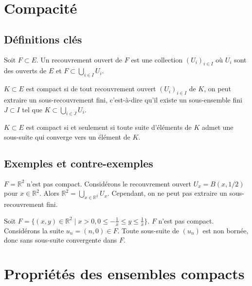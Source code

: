 \documentclass[oneside]{book}
\begin{document}
\section{Compacité}

\subsection{Définitions clés}

\begin{definition}
Soit $F \subset E$. Un recouvrement ouvert de $F$ est une collection $(U_i)_{i \in I}$ où $U_i$ sont des ouverts de $E$ et $F \subset \bigcup_{i \in I} U_i$.
\end{definition}

\begin{definition}
$K \subset E$ est compact si de tout recouvrement ouvert $(U_i)_{i \in I}$ de $K$, on peut extraire un sous-recouvrement fini, c'est-à-dire qu'il existe un sous-ensemble fini $J \subset I$ tel que $K \subset \bigcup_{i \in J} U_i$.
\end{definition}

\begin{theorem}
$K \subset E$ est compact si et seulement si toute suite d'éléments de $K$ admet une sous-suite qui converge vers un élément de $K$.
\end{theorem}

\subsection{Exemples et contre-exemples}

\begin{example}
$F = \mathbb{R}^2$ n'est pas compact. Considérons le recouvrement ouvert $U_x = B(x, 1/2)$ pour $x \in \mathbb{R}^2$. Alors $\mathbb{R}^2 = \bigcup_{x \in \mathbb{R}^2} U_x$. Cependant, on ne peut pas extraire un sous-recouvrement fini.
\end{example}

\begin{example}
Soit $F = \{(x, y) \in \mathbb{R}^2 \mid x > 0, 0 \leq -\frac{1}{x} \leq y \leq \frac{1}{x} \}$. $F$ n'est pas compact. Considérons la suite $u_n = (n, 0) \in F$. Toute sous-suite de $(u_n)$ est non bornée, donc sans sous-suite convergente dans $F$.
\end{example}

\section{Propriétés des ensembles compacts}
\end{document}
